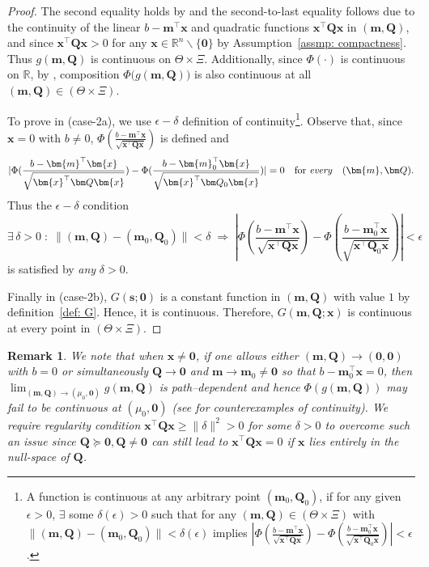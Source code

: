 \documentclass[opre,sglanonrev]{informs4}
\newtheorem{remark}{Remark}
\newcommand{\mbR}{\mathbb R}
\newcommand{\mbS}{\mathbb S}
\newcommand{\bzero}{\bm{0}}
\newcommand{\bmean}{\bm{m}}
\newcommand{\bs}{\bm{s}}
\newcommand{\bx}{\bm{x}}
\newcommand{\bQ}{\bm Q}
\begin{document}
{\begin{proof}
\noindent The second equality holds by \cite[Theorem~4.4]{rudin2021principles} and the second-to-last equality follows due to the continuity of the linear $b-\bmean^\top \bx$ and quadratic functions $\bx^\top \bQ \bx$ in $(\bmean, \bQ)$, and since $\bx^\top \bQ \bx > 0$ for any $\bx \in \mbR^n \backslash \{\bzero\}$ by Assumption~\ref{assmp: compactness}. Thus $g(\bmean, \bQ)$ is continuous on $\Theta \times \Xi$. Additionally, since $\Phi(\cdot)$ is continuous on $\mbR$, by \cite[Theorem~4.7]{rudin2021principles}, composition $\Phi\big(g(\bmean, \bQ)\big)$ is also continuous at all $(\bmean, \bQ) \in (\Theta \times \Xi)$.

To prove in (case-2a),  we use $\epsilon-\delta$ definition of continuity\footnote{A function is continuous at any arbitrary point $(\bmean_{0},\bQ_0)$, if for any given $\epsilon > 0$, $\exists$ some $\delta(\epsilon) > 0$ such that for any $(\bmean, \bQ) \in (\Theta \times \Xi)$ with $\bigl\|(\bmean,\bQ)-(\bmean_{0},\bQ_0)\bigr\|<\delta(\epsilon)$ implies $|\Phi(\frac{b-\bmean^\top \bx}{\sqrt{\bx^\top \bQ \bx}}) - \Phi(\frac{b-\bmean_0^\top \bx}{\sqrt{\bx^\top \bQ_0 \bx}})| < \epsilon$.}. Observe that, since $\bx = 0$ with $b\neq 0$, $\Phi(\frac{b-\bmean^\top \bx}{\sqrt{\bx^\top \bQ \bx}})$ is defined and 
\[
|\Phi(\frac{b-\bmean^\top \bx}{\sqrt{\bx^\top \bQ \bx}})-\Phi(\frac{b-\bmean_0^\top \bx}{\sqrt{\bx^\top \bQ_0 \bx}})|=0
\quad\text{for \emph{every}}\quad (\bmean,\bQ).
\]
Thus the $\epsilon-\delta$ condition
\[
\exists\,\delta>0\;:\;
\bigl\|(\bmean,\bQ)-(\bmean_{0},\bQ_0)\bigr\|<\delta
\;\Longrightarrow\;
|\Phi(\frac{b-\bmean^\top \bx}{\sqrt{\bx^\top \bQ \bx}})-\Phi(\frac{b-\bmean_0^\top \bx}{\sqrt{\bx^\top \bQ_0 \bx}})|
   <\epsilon
\]
is satisfied by \emph{any} \(\delta > 0\). 

Finally in (case-2b), $G(\bs; \bzero)$ is a constant function in $(\bmean, \bQ)$ with value $1$ by definition~\eqref{def: G}. Hence, it is continuous. Therefore, \(G(\bmean, \bQ; \bx)\) is continuous at every point in
$(\Theta \times \Xi)$.
\end{proof}
\normalsize
\begin{remark}
We note that when $\bx \neq \bzero$, if one allows either $(\bmean, \bQ) \to (\bzero, \bzero)$ with $b = 0$ or simultaneously $\bQ\to \bzero$ and $\bmean\to\bmean_0 \neq \bzero$ so that $b - \bmean_0^\top \bx=0$, then $\lim_{(\bmean,\bQ)\to(\mu_0,\bzero)}g(\bmean,\bQ)$
is path–dependent and hence $\Phi(g(\bmean, \bQ))$ may fail to be continuous at $(\mu_0, \bzero)$ (see \cite[Chapter 9]{rudin2021principles} for counterexamples of continuity). 
We require regularity condition $\bx^\top \bQ \bx \geq \|\delta\|^2 > 0$ for some $\delta > 0$ to overcome such an issue since $\bQ \succeq \bzero, \bQ \neq \bzero$ can still lead to $\bx^\top \bQ \bx = 0$ if $\bx$ lies entirely in the null-space of $\bQ$. %
\end{remark}

}
\end{document}
